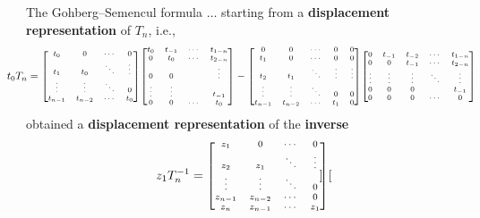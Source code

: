 \documentclass[aspectratio=169,xcolor=dvipsnames]{beamer}
\begin{document}
\begin{frame}{The Gohberg--Semencul formula}
$\ldots$ starting from a \textbf{displacement representation} of $T_n$, i.e., 
\[\hspace{-1.9em}\scriptsize
t_0 T_n = \begin{bmatrix}
	t_0 & 0 & \cdots & 0 \\
	t_1 & t_0 & \ddots & \vdots \\
	\vdots & \vdots & \ddots & 0 \\
	t_{n-1} & t_{n-2} & \cdots & t_0 
\end{bmatrix}\hspace{-0.2em}\begin{bmatrix}
t_0 & t_{-1} & \cdots & t_{1-n} \\
0 & t_0 & \cdots & t_{2-n} \\
0 & 0 &  & \vdots \\
\vdots & \vdots & & t_{-1} \\
0 & 0 & \cdots & t_0
\end{bmatrix} - \begin{bmatrix}
0 & 0 & \cdots & 0  & 0 \\
t_1 & 0 & \cdots & 0 & 0 \\
t_2 & t_1 & \ddots & \vdots & \vdots \\
\vdots & \vdots & \ddots & 0 & 0 \\
t_{n-1} & t_{n-2} & \cdots & t_1 & 0
\end{bmatrix}\hspace{-0.2em}\begin{bmatrix}
0 & t_{-1} & t_{-2} & \cdots & t_{1-n} \\
0 & 0 & t_{-1} & \cdots & t_{2-n} \\
\vdots & \vdots & \vdots & \ddots & \vdots \\
0 & 0 & 0 & & t_{-1} \\
0 & 0 & 0 & \cdots & 0
\end{bmatrix}
\]
\cite{MR0353038} obtained a \textbf{displacement representation} of the \textbf{inverse}
\[\hspace{-1.9em}\scriptsize
z_1 T_n^{-1} = \begin{bmatrix}
	z_1 & 0 & \cdots & 0 \\
	z_2 & z_1 & \ddots & \vdots \\
	\vdots & \vdots & \ddots & 0 \\
	z_{n-1} & z_{n-2} & \cdots & 0 \\
	z_{n} & z_{n-1} & \cdots & z_1 
\end{bmatrix}\hspace{-0.2em}\begin{bmatrix}

\end{bmatrix}\]
\end{frame}
\end{document}
